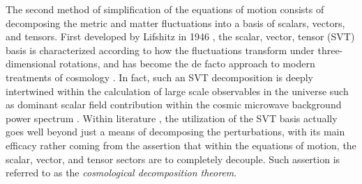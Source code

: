 The second method of simplification of the equations of motion consists of decomposing the metric and matter fluctuations into a basis of scalars, vectors, and tensors. First developed by Lifshitz in 1946 \cite{lifshitz_2017}, the scalar, vector, tensor (SVT) basis is characterized according to how the fluctuations transform under three-dimensional rotations, and has become the de facto approach to modern treatments of cosmology \cite{bardeen_1980, bertschinger_2000, ellis_maartens_maccallum_2009, mukhanov_1992, york_1973, weinberg_2008}. In fact, such an SVT decomposition is deeply intertwined within the calculation of large scale observables in the universe such as dominant scalar field contribution within the cosmic microwave background power spectrum \cite{hu_dodelson_2002,kodama_sasaki_1984}. Within literature \cite{kodama_sasaki_1984, bardeen_1980, ellis_maartens_maccallum_2009}, the utilization of the SVT basis actually goes well beyond just a means of decomposing the perturbations, with its main efficacy rather coming from the assertion that within the equations of motion, the scalar, vector, and tensor sectors are to completely decouple. Such assertion is referred to as the \emph{cosmological decomposition theorem}.


